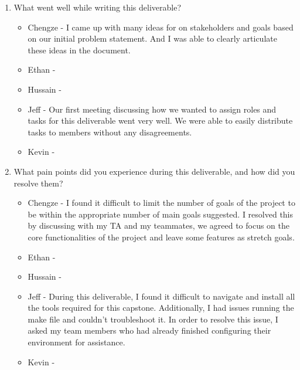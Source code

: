 \documentclass{article}
\begin{document}
\begin{enumerate}
    \item What went well while writing this deliverable? 
    \begin{itemize}
        \item Chengze - I came up with many ideas for on stakeholders 
        and goals based on our initial problem statement. And I was 
        able to clearly articulate these ideas in the document.
        \item Ethan - 
        \item Hussain -
        \item Jeff - Our first meeting discussing how we wanted to assign roles 
        and tasks for this deliverable went very well. 
        We were able to easily distribute tasks to members without any disagreements.
        \item Kevin -
    \end{itemize}

    \item What pain points did you experience during this deliverable, and how
    did you resolve them?
    \begin{itemize}
        \item Chengze - I found it difficult to limit the number 
        of goals of the project to be within the appropriate number 
        of main goals suggested. I resolved this by discussing with 
        my TA and my teammates, we agreed to focus on the core 
        functionalities of the project and leave some features as 
        stretch goals. 
        \item Ethan - 
        \item Hussain -
        \item Jeff - During this deliverable, I found it difficult to 
        navigate and install all the tools required for this capstone. 
        Additionally, I had issues running the make file and 
        couldn't troubleshoot it. In order to resolve this issue,
        I asked my team members who had already finished configuring their
        environment for assistance.
        \item Kevin -
    \end{itemize}
    

\end{enumerate}
\end{document}
